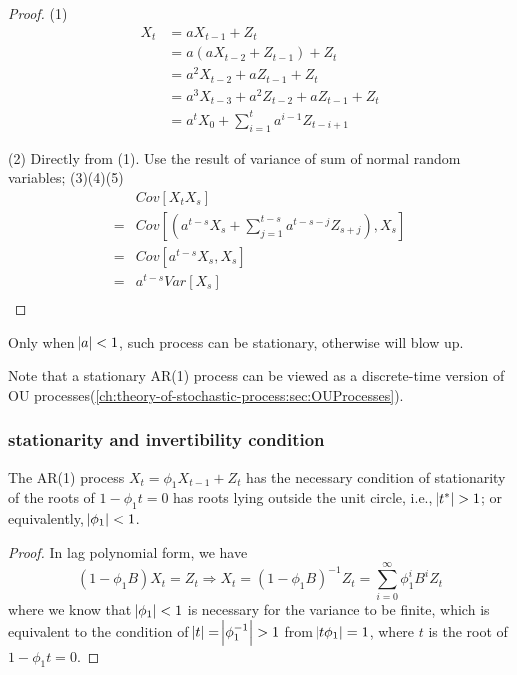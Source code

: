 \begin{proof}
(1)
\begin{align*}
X_t &= aX_{t-1}+Z_t \\
&= a(aX_{t-2}+Z_{t-1})+Z_t\\
&= a^2 X_{t-2} + a Z_{t-1} + Z_t\\
&= a^3 X_{t-3} + a^2Z_{t-2} + a Z_{t-1} + Z_t\\
&= a^t X_0 + \sum_{i=1}^{t} a^{i-1}Z_{t-i+1} 
\end{align*}

(2) Directly from (1). Use the result of variance of sum of normal random variables; (3)(4)(5)
\begin{align*}
&Cov[X_tX_s] \\
=& Cov[(a^{t-s}X_s + \sum_{j=1}^{t-s} a^{t-s-j}Z_{s+j}),X_s] \\
=& Cov[a^{t-s}X_s,X_s] \\
=& a^{t-s}Var[X_s] \\
\end{align*}
\end{proof}


\begin{remark}[stationarity]
Only when $\abs{a}<1$, such process can be stationary, otherwise will blow up.
\end{remark}

\begin{remark}
Note that a stationary AR(1) process can be viewed as a discrete-time version of OU processes(\autoref{ch:theory-of-stochastic-process:sec:OUProcesses}).
\end{remark}


\subsubsection{stationarity and invertibility condition}
\begin{lemma}
\cite[54]{box2015time}The AR(1) process $X_t = \phi_1 X_{t-1} + Z_t$ has the necessary condition of stationarity of the roots of $1-\phi_1 t = 0$ has roots lying outside the unit circle, i.e., $\abs{t^*} > 1$; or equivalently, $\abs{\phi_1} <1$.
\end{lemma}
\begin{proof}
In lag polynomial form, we have $$(1-\phi_1 B)X_t = Z_t \Rightarrow X_t = (1-\phi_1 B)^{-1}Z_t = \sum_{i=0}^\infty \phi^i_1 B^i Z_t$$
where we know that $\abs{\phi_1}<1$ is necessary for the variance to be finite, which is equivalent to the condition of $\abs{t}=\abs{\phi_1^{-1}} > 1$  from $\abs{t\phi_1}=1$, where $t$ is the root of $1-\phi_1 t = 0$. 
\end{proof}


